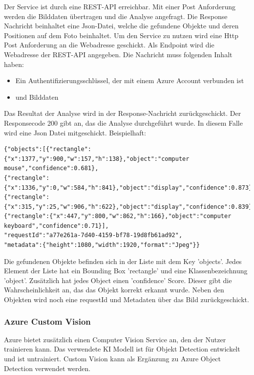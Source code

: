 Der Service ist durch eine REST-API erreichbar. Mit einer Post Anforderung werden die Bilddaten übertragen und die Analyse angefragt. Die Response Nachricht beinhaltet eine Json-Datei, welche die gefundene Objekte und deren Positionen auf dem Foto beinhaltet. 
Um den Service zu nutzen wird eine Http Post Anforderung an die Webadresse geschickt. Als Endpoint wird die Webadresse der REST-API angegeben. Die Nachricht muss folgenden Inhalt haben:
\begin{itemize}
	\item Ein Authentifizierungsschlüssel, der mit einem Azure Account verbunden ist
	\item und Bilddaten
\end{itemize}

Das Resultat der Analyse wird in der Response-Nachricht zurückgeschickt. Der Responsecode 200 gibt an, das die Analyse durchgeführt wurde. In diesem Falle wird eine Json Datei mitgeschickt. Beispielhaft:

\begin{lstlisting}
{"objects":[{"rectangle":{"x":1377,"y":900,"w":157,"h":138},"object":"computer mouse","confidence":0.681},
{"rectangle":{"x":1336,"y":0,"w":584,"h":841},"object":"display","confidence":0.873},
{"rectangle":{"x":315,"y":25,"w":906,"h":622},"object":"display","confidence":0.839},
{"rectangle":{"x":447,"y":800,"w":862,"h":166},"object":"computer keyboard","confidence":0.71}],
"requestId":"a77e261a-7d40-4159-bf78-19d8fb61ad92",
"metadata":{"height":1080,"width":1920,"format":"Jpeg"}}
\end{lstlisting}

Die gefundenen Objekte befinden sich in der Liste mit dem Key 'objects'. Jedes Element der Liste hat ein Bounding Box 'rectangle' und eine Klassenbezeichnung 'object'. Zusätzlich hat jedes Object einen 'confidence' Score. Dieser gibt die Wahrscheinlichkeit an, das das Objekt korrekt erkannt wurde. 
Neben den Objekten wird noch eine requestId und Metadaten über das Bild zurückgeschickt.

\subsubsection{Azure Custom Vision}
Azure bietet zusätzlich einen Computer Vision Service an, den der Nutzer trainieren kann. 
Das verwendete KI Modell ist für Objekt Detection entwickelt und ist untrainiert.
Custom Vision kann als Ergänzung zu Azure Object Detection verwendet werden.\citep{Azure302bDoc}

